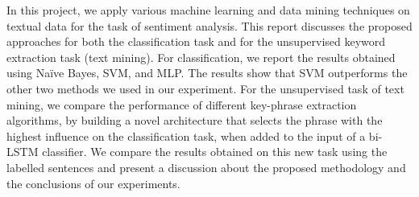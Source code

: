 


In this project, we apply various machine learning and data mining techniques on textual data for the task of sentiment analysis. This report discusses the proposed approaches for both the classification task and for the unsupervised keyword extraction task (text mining). For classification, we report the results obtained using Naïve Bayes, SVM, and MLP. The results show that SVM outperforms the other two methods we used in our experiment. For the unsupervised task of text mining, we compare the performance of different key-phrase extraction algorithms, by building a novel architecture that selects the phrase with the highest influence on the classification task, when added to the input of a bi-LSTM classifier. We compare the results obtained on this new task using the labelled sentences and present a discussion about the proposed methodology and the conclusions of our experiments.